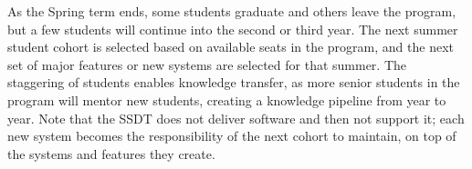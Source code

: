 As the Spring term ends, some students graduate and others leave the program, but a few students will continue into the second or third year. The next summer student cohort is selected based on available seats in the program, and the next set of major features or new systems are selected for that summer. The staggering of students enables knowledge transfer, as more senior students in the program will mentor new students, creating a knowledge pipeline from year to year. Note that the SSDT does not deliver software and then not support it; each new system becomes the responsibility of the next cohort to maintain, on top of the systems and features they create.



